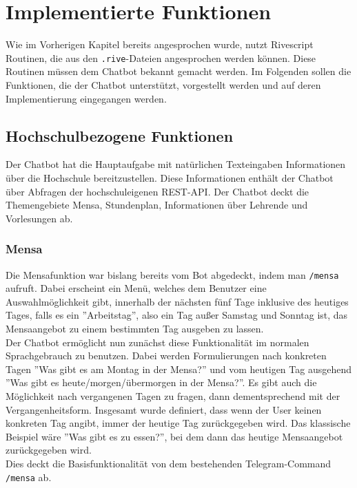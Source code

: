 \chapter{Implementierte Funktionen}
Wie im Vorherigen Kapitel bereits angesprochen wurde, nutzt Rivescript Routinen, die aus den \texttt{.rive}-Dateien angesprochen werden können. Diese Routinen müssen dem Chatbot bekannt gemacht werden. Im Folgenden sollen die Funktionen, die der Chatbot unterstützt, vorgestellt werden und auf deren Implementierung eingegangen werden.

\section{Hochschulbezogene Funktionen}
Der Chatbot hat die Hauptaufgabe mit natürlichen Texteingaben Informationen über die Hochschule bereitzustellen. Diese Informationen enthält der Chatbot über Abfragen der hochschuleigenen REST-API. Der Chatbot deckt die Themengebiete Mensa, Stundenplan, Informationen über Lehrende und Vorlesungen ab.

\subsection{Mensa}
Die Mensafunktion war bislang bereits vom Bot abgedeckt, indem man \texttt{/mensa} aufruft. Dabei erscheint ein Menü, welches dem Benutzer eine Auswahlmöglichkeit gibt, innerhalb der nächsten fünf Tage inklusive des heutiges Tages, falls es ein ''Arbeitstag'', also ein Tag außer Samstag und Sonntag ist, das Mensaangebot zu einem bestimmten Tag ausgeben zu lassen. \\
Der Chatbot ermöglicht nun zunächst diese Funktionalität im normalen Sprachgebrauch zu benutzen. Dabei werden Formulierungen nach konkreten Tagen ''Was gibt es am Montag in der Mensa?'' und vom heutigen Tag ausgehend ''Was gibt es heute/morgen/übermorgen in der Mensa?''. Es gibt auch die Möglichkeit nach vergangenen Tagen zu fragen, dann dementsprechend mit der Vergangenheitsform. Insgesamt wurde definiert, dass wenn der User keinen konkreten Tag angibt, immer der heutige Tag zurückgegeben wird. Das klassische Beispiel wäre ''Was gibt es zu essen?'', bei dem dann das heutige Mensaangebot zurückgegeben wird. \\
Dies deckt die Basisfunktionalität von dem bestehenden Telegram-Command \texttt{/mensa} ab.


